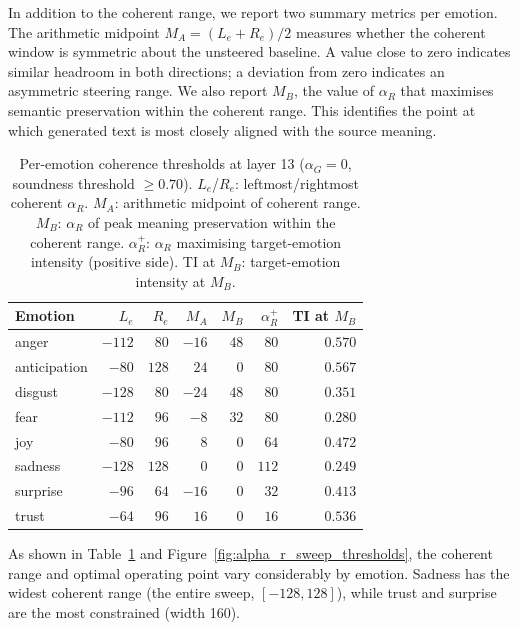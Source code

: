 In addition to the coherent range, we report two summary metrics per emotion. The arithmetic midpoint $M_A=(L_e+R_e)/2$ measures whether the coherent window is symmetric about the unsteered baseline. A value close to zero indicates similar headroom in both directions; a deviation from zero indicates an asymmetric steering range. We also report $M_B$, the value of $\alpha_R$ that maximises semantic preservation within the coherent range. This identifies the point at which generated text is most closely aligned with the source meaning.\par

\begin{table}[H]
\centering
\small
\begin{tabular}{lrrrrrr}
\toprule
\textbf{Emotion} & $L_e$ & $R_e$ & $M_A$ & $M_B$ & $\alpha_R^{+}$ & TI at $M_B$ \\
\midrule
anger        & $-112$ & $80$  & $-16$ & $48$ & $80$  & $0.570$ \\
anticipation & $-80$  & $128$ & $24$  & $0$  & $80$  & $0.567$ \\
disgust      & $-128$ & $80$  & $-24$ & $48$ & $80$  & $0.351$ \\
fear         & $-112$ & $96$  & $-8$  & $32$ & $80$  & $0.280$ \\
joy          & $-80$  & $96$  & $8$   & $0$  & $64$  & $0.472$ \\
sadness      & $-128$ & $128$ & $0$   & $0$  & $112$ & $0.249$ \\
surprise     & $-96$  & $64$  & $-16$ & $0$  & $32$  & $0.413$ \\
trust        & $-64$  & $96$  & $16$  & $0$  & $16$  & $0.536$ \\
\bottomrule
\end{tabular}
\caption{Per-emotion coherence thresholds at layer 13 ($\alpha_G = 0$, soundness threshold $\geq 0.70$). $L_e$/$R_e$: leftmost/rightmost coherent $\alpha_R$. $M_A$: arithmetic midpoint of coherent range. $M_B$: $\alpha_R$ of peak meaning preservation within the coherent range. $\alpha_R^{+}$: $\alpha_R$ maximising target-emotion intensity (positive side). TI at $M_B$: target-emotion intensity at $M_B$.}\label{tab:alpha_r_thresholds}
\end{table}

As shown in Table~\ref{tab:alpha_r_thresholds} and Figure~\ref{fig:alpha_r_sweep_thresholds}, the coherent range and optimal operating point vary considerably by emotion. Sadness has the widest coherent range (the entire sweep, $[-128, 128]$), while trust and surprise are the most constrained (width 160).\par

